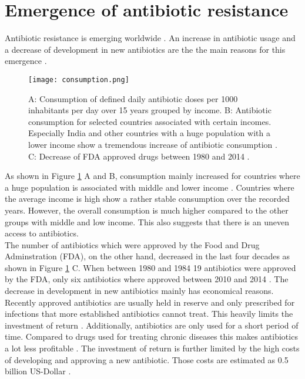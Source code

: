 \section{Emergence of antibiotic resistance}
Antibiotic resistance is emerging worldwide \cite{ventola_antibiotic_2015}. An increase in antibiotic usage and a decrease of development in new antibiotics are the the main reasons for this emergence \cite{ventola_antibiotic_2015}. 
\begin{figure}
	\texttt{[image: consumption.png]}
	\caption{A: Consumption of defined daily antibiotic doses per 1000 inhabitants per day over 15 years grouped by income.  B: Antibiotic consumption for selected countries associated with certain incomes. Especially India and other countries with a huge population with a lower income show a tremendous increase of antibiotic consumption \cite{klein_global_2018}. C: Decrease of FDA approved drugs between 1980 and 2014 \cite{ventola_antibiotic_2015}.}
	\label{figure:emergence}
\end{figure}
As shown in Figure \ref{figure:emergence} A and B, consumption mainly increased for countries where a huge population is associated with middle and lower income \cite{klein_global_2018}. Countries where the average income is high show a rather stable consumption over the recorded years. However, the overall consumption is much higher compared to the other groups with middle and low income. This also suggests that there is an uneven access to antibiotics. \\
The number of antibiotics which were approved by the Food and Drug  Adminstration (FDA), on the other hand, decreased in the last four decades as shown in Figure \ref{figure:emergence} C. When between 1980 and 1984 19 antibiotics were approved by the FDA, only six antibiotics where approved between 2010 and 2014 \cite{ventola_antibiotic_2015}. The decrease in development in new antibiotics mainly has economical reasons. Recently approved antibiotics are usually held in reserve and only prescribed for infections that more established antibiotics cannot treat. This heavily limits the investment of return \cite{fair_antibiotics_2014}. Additionally, antibiotics are only used for a short period of time. Compared to drugs used for treating chronic diseases this makes antibiotics a lot less profitable  \cite{fair_antibiotics_2014}. The investment of return is further limited by the high costs of developing and approving a new antibiotic. Those costs are estimated as 0.5 billion US-Dollar \cite{costs}. \\
